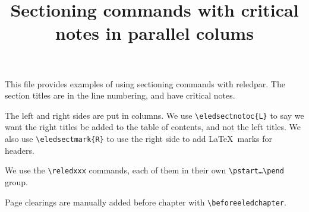 \documentclass{scrbook}
\begin{document}
\date{}
\title{Sectioning commands with critical notes in parallel colums}



{\let\newpage\relax\maketitle}
{\small
This file provides examples of using sectioning commands with reledpar. The section titles are in the line numbering, and have critical notes.

The left and right sides are put in columns. We use \verb+\eledsectnotoc{L}+ to say we want the right titles be added to the table of contents, and not the left titles. 
We also use \verb+\eledsectmark{R}+ to use the right side to add \LaTeX\ marks for headers. 

We use the \verb+\reledxxx+ commands, each of them in their own \verb+\pstart…\pend+ group. 

Page clearings are manually added before chapter with \verb+\beforeeledchapter+.
}


\tableofcontents

\beforeeledchapter
\end{document}
